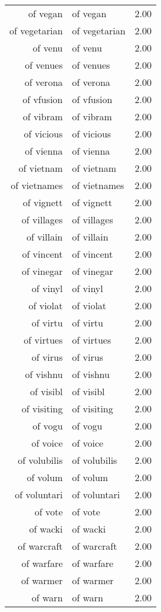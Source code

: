 \begin{table}[ht]
\begin{tabular}{rlr}
  of vegan & of vegan & 2.00 \\ 
  of vegetarian & of vegetarian & 2.00 \\ 
  of venu & of venu & 2.00 \\ 
  of venues & of venues & 2.00 \\ 
  of verona & of verona & 2.00 \\ 
  of vfusion & of vfusion & 2.00 \\ 
  of vibram & of vibram & 2.00 \\ 
  of vicious & of vicious & 2.00 \\ 
  of vienna & of vienna & 2.00 \\ 
  of vietnam & of vietnam & 2.00 \\ 
  of vietnames & of vietnames & 2.00 \\ 
  of vignett & of vignett & 2.00 \\ 
  of villages & of villages & 2.00 \\ 
  of villain & of villain & 2.00 \\ 
  of vincent & of vincent & 2.00 \\ 
  of vinegar & of vinegar & 2.00 \\ 
  of vinyl & of vinyl & 2.00 \\ 
  of violat & of violat & 2.00 \\ 
  of virtu & of virtu & 2.00 \\ 
  of virtues & of virtues & 2.00 \\ 
  of virus & of virus & 2.00 \\ 
  of vishnu & of vishnu & 2.00 \\ 
  of visibl & of visibl & 2.00 \\ 
  of visiting & of visiting & 2.00 \\ 
  of vogu & of vogu & 2.00 \\ 
  of voice & of voice & 2.00 \\ 
  of volubilis & of volubilis & 2.00 \\ 
  of volum & of volum & 2.00 \\ 
  of voluntari & of voluntari & 2.00 \\ 
  of vote & of vote & 2.00 \\ 
  of wacki & of wacki & 2.00 \\ 
  of warcraft & of warcraft & 2.00 \\ 
  of warfare & of warfare & 2.00 \\ 
  of warmer & of warmer & 2.00 \\ 
  of warn & of warn & 2.00 \\ 

\end{tabular}
\end{table}
